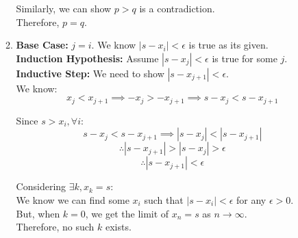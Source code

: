 \documentclass[a4paper]{article}
\begin{document}
\begin{enumerate}
\begin{enumerate}
            Similarly, we can show $p > q$ is a contradiction. \\
            Therefore, $p = q$. \\

            \item \textbf{Base Case:} $j = i$. We know $|s - x_i| < \epsilon$ is true as its given. \\
            \textbf{Induction Hypothesis:} Assume $|s - x_j| < \epsilon$ is true for some $j$. \\
            \textbf{Inductive Step:} We need to show $|s - x_{j+1}| < \epsilon$. \\

            We know:
            \[x_j < x_{j + 1} \implies -x_j > -x_{j+1} \implies s - x_j < s - x_{j + 1}\]

            Since $s > x_i, \forall i$:
            \[s - x_j < s - x_{j + 1} \implies |s - x_j| < |s - x_{j + 1}| \]
            \[\therefore |s - x_{j + 1}| > |s - x_{j}| > \epsilon\]
            \[\therefore |s - x_{j + 1}| < \epsilon \]

            Considering $\exists k, x_k = s$: \\
            We know we can find some $x_i$ such that $|s - x_i| < \epsilon$ for any $\epsilon > 0$. \\
            But, when $k=0$, we get the limit of $x_n = s$ as $n \rightarrow \infty$. \\
            Therefore, no such $k$ exists. \\
        \end{enumerate}
    \end{enumerate}
\end{document}
